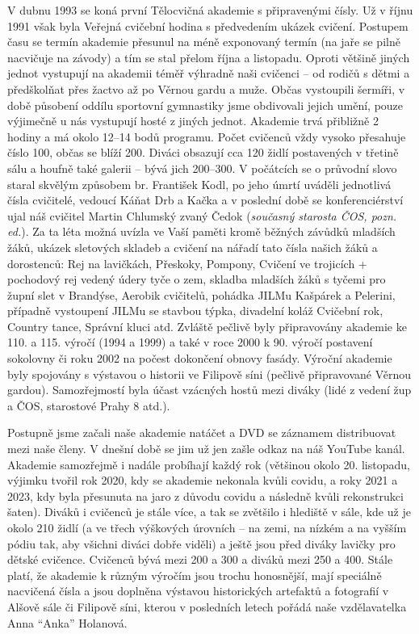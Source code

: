 V dubnu 1993 se koná první Tělocvičná akademie s připravenými čísly. Už
v říjnu 1991 však byla Veřejná cvičební hodina s předvedením ukázek
cvičení. Postupem času se termín akademie přesunul na méně exponovaný
termín (na jaře se pilně nacvičuje na závody) a tím se stal přelom října
a listopadu. Oproti většině jiných jednot vystupují na akademii téměř
výhradně naši cvičenci -- od rodičů s dětmi a předškolňat přes žactvo až
po Věrnou gardu a muže. Občas vystoupili šermíři, v době působení oddílu
sportovní gymnastiky jsme obdivovali jejich umění, pouze výjimečně u nás
vystupují hosté z jiných jednot. Akademie trvá přibližně 2 hodiny a má
okolo 12--14 bodů programu. Počet cvičenců vždy vysoko přesahuje číslo
100, občas se blíží 200. Diváci obsazují cca 120 židlí postavených v
třetině sálu a houfně také galerii -- bývá jich 200--300. V počátcích se
o průvodní slovo staral skvělým způsobem br. František Kodl, po jeho
úmrtí uváděli jednotlivá čísla cvičitelé, vedoucí Káňat Drb a Kačka a v
poslední době se konferenciérství ujal náš cvičitel Martin Chlumský
zvaný Čedok (\emph{současný starosta ČOS, pozn. ed.}). Za ta léta možná
uvízla ve Vaší paměti kromě běžných závůdků mladších žáků, ukázek
sletových skladeb a cvičení na nářadí tato čísla našich žáků a
dorostenců: Rej na lavičkách, Přeskoky, Pompony, Cvičení ve trojicích +
pochodový rej vedený údery tyče o zem, skladba mladších žáků s tyčemi
pro župní slet v Brandýse, Aerobik cvičitelů, pohádka JILMu Kašpárek a
Pelerini, případně vystoupení JILMu se stavbou týpka, divadelní koláž
Cvičební rok, Country tance, Správní kluci atd. Zvláště pečlivě byly
připravovány akademie ke 110. a 115. výročí (1994 a 1999) a také v roce
2000 k 90. výročí postavení sokolovny či roku 2002 na počest dokončení
obnovy fasády. Výroční akademie byly spojovány s výstavou o historii ve
Filipově síni (pečlivě připravované Věrnou gardou). Samozřejmostí byla
účast vzácných hostů mezi diváky (lidé z vedení žup a ČOS, starostové
Prahy 8 atd.).

Postupně jsme začali naše akademie natáčet a DVD se záznamem
distribuovat mezi naše členy. V dnešní době se jim už jen zašle odkaz na
náš YouTube kanál. Akademie samozřejmě i nadále probíhají každý rok
(většinou okolo 20. listopadu, výjimku tvořil rok 2020, kdy se akademie
nekonala kvůli covidu, a roky 2021 a 2023, kdy byla přesunuta na jaro z
důvodu covidu a následně kvůli rekonstrukci šaten). Diváků i cvičenců je
stále více, a tak se zvětšilo i hlediště v sále, kde už je okolo 210
židlí (a ve třech výškových úrovních -- na zemi, na nízkém a na vyšším
pódiu tak, aby všichni diváci dobře viděli) a ještě jsou před diváky
lavičky pro dětské cvičence. Cvičenců bývá mezi 200 a 300 a diváků mezi
250 a 400. Stále platí, že akademie k různým výročím jsou trochu
honosnější, mají speciálně nacvičená čísla a jsou doplněna výstavou
historických artefaktů a fotografií v Alšově sále či Filipově síni,
kterou v posledních letech pořádá naše vzdělavatelka Anna ``Anka''
Holanová.

